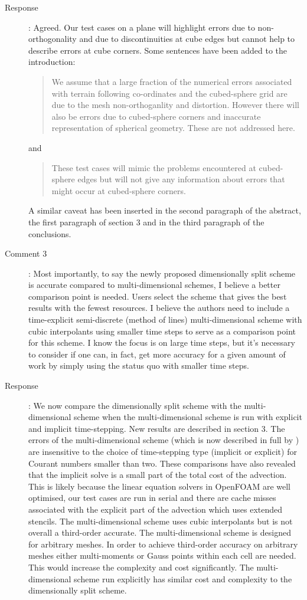 \documentclass[12pt]{article}
\begin{document}
\begin{description}
\item [Response]:
Agreed. Our test cases on a plane will highlight errors due to non-orthogonality and due to discontinuities at cube edges but cannot help to describe errors at cube corners. Some sentences have been added to the introduction:
\begin{quote}
We assume that a large fraction of the numerical errors associated with terrain following co-ordinates and the cubed-sphere grid are due to the mesh non-orthoganlity and distortion. However there will also be errors due to cubed-sphere corners and inaccurate representation of spherical geometry. These are not addressed here. 
\end{quote}
and
\begin{quote}
These test cases will mimic the problems encountered at cubed-sphere edges but will not give any information about errors that might occur at cubed-sphere corners. 
\end{quote}
A similar caveat has been inserted in the second paragraph of the abstract, the first paragraph of section 3 and in the third paragraph of the conclusions. 

\item [Comment 3]: Most importantly, to say the newly proposed dimensionally split scheme is accurate compared to multi-dimensional schemes, I believe a better comparison point is needed. Users select the scheme that gives the best results with the fewest resources. I believe the authors need to include a time-explicit semi-discrete (method of lines) multi-dimensional scheme with cubic interpolants using smaller time steps to serve as a comparison point for this scheme. I know the focus is on large time steps, but it's necessary to consider if one can, in fact, get more accuracy for a given amount of work by simply using the status quo with smaller time steps. 

\item [Response]: 
We now compare the dimensionally split scheme with the multi-dimensional scheme when the multi-dimensional scheme is run with explicit and implicit time-stepping. New results are described in section 3. The errors of the multi-dimensional scheme (which is now described in full by \cite{SWMD17}) are insensitive to the choice of time-stepping type (implicit or explicit) for Courant numbers smaller than two. These comparisons have also revealed that the implicit solve is a small part of the total cost of the advection. This is likely because the linear equation solvers in OpenFOAM are well optimised, our test cases are run in serial and there are cache misses associated with the explicit part of the advection which uses extended stencils. The multi-dimensional scheme uses cubic interpolants but is not overall a third-order accurate. The multi-dimensional scheme is designed for arbitrary meshes. In order to achieve third-order accuracy on arbitrary meshes either multi-moments or Gauss points within each cell are needed. This would increase the complexity and cost significantly. The multi-dimensional scheme run explicitly has similar cost and complexity to the dimensionally split scheme. 

\end{description}
\end{document}
